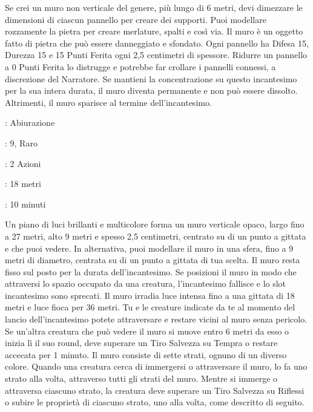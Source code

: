 \begin{multicols}{2}
Se crei un muro non verticale del genere, più lungo di 6 metri, devi dimezzare le dimensioni di ciascun pannello per creare dei supporti. Puoi modellare rozzamente la pietra per creare merlature, spalti e così via. Il muro è un oggetto fatto di pietra che può essere danneggiato e sfondato. Ogni pannello ha Difesa 15, Durezza 15 e 15 Punti Ferita ogni 2,5 centimetri di spessore. Ridurre un pannello a 0 Punti Ferita lo distrugge e potrebbe far crollare i pannelli connessi, a discrezione del Narratore. Se mantieni la concentrazione su questo incantesimo per la sua intera durata, il muro diventa permanente e non può essere dissolto. Altrimenti, il muro sparisce al termine dell'incantesimo.

\noindent\colorbox{OBSSgold!10}{
\begin{minipage}{0.95\linewidth}
\begin{description}[noitemsep, topsep=0pt, parsep=0pt, partopsep=0pt, leftmargin=0cm, labelwidth=1.3cm]
	\item[\textbf{Lista}]: Abiurazione
	\item[\textbf{Livello}]: 9, Raro
	\item[\textbf{Lancio}]: 2 Azioni
	\item[\textbf{Gittata}]: 18 metri
	\item[\textbf{Durata}]: 10 minuti
\end{description}
\end{minipage}}\smallskip

Un piano di luci brillanti e multicolore forma un muro verticale opaco, largo fino a 27 metri, alto 9 metri e spesso 2,5 centimetri, centrato su di un punto a gittata e che puoi vedere. In alternativa, puoi modellare il muro in una sfera, fino a 9 metri di diametro, centrata su di un punto a gittata di tua scelta. Il muro resta fisso sul posto per la durata dell'incantesimo. Se posizioni il muro in modo che attraversi lo spazio occupato da una creatura, l'incantesimo fallisce e lo slot incantesimo sono sprecati. Il muro irradia luce intensa fino a una gittata di 18 metri e luce fioca per 36 metri. Tu e le creature indicate da te al momento del lancio dell'incantesimo potete attraversare e restare vicini al muro senza pericolo. Se un'altra creatura che può vedere il muro si muove entro 6 metri da esso o inizia lì il suo round, deve superare un Tiro Salvezza su Tempra o restare accecata per 1 minuto. Il muro consiste di sette strati, ognuno di un diverso colore. Quando una creatura cerca di immergersi o attraversare il muro, lo fa uno strato alla volta, attraverso tutti gli strati del muro. Mentre si immerge o attraversa ciascuno strato, la creatura deve superare un Tiro Salvezza su Riflessi o subire le proprietà di ciascuno strato, uno alla volta, come descritto di seguito.


\end{multicols}
